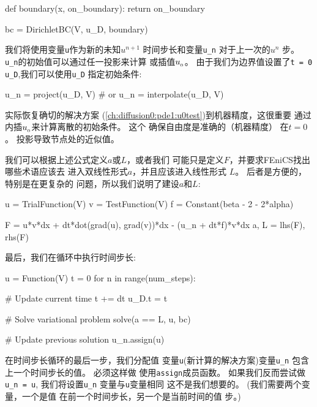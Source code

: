 \begin{python}
def boundary(x, on_boundary):
    return on_boundary

bc = DirichletBC(V, u_D, boundary)
\end{python}

我们将使用变量\texttt{u}作为新的未知$u^{n+1}$
时间步长和变量\verb!u_n! 对于上一次的$u^n$
步。 \verb!u_n!的初始值可以通过任一投影来计算
或插值$u_{_0}$。 由于我们为边界值设置了\texttt{t = 0}
\verb!u_D!,我们可以使用\verb!u_D! 指定初始条件:

\begin{python}
u_n = project(u_D, V)
# or
u_n = interpolate(u_D, V)
\end{python}

\begin{notice}[投影与内插初始条件]
实际恢复确切的解决方案
(\ref{ch:diffusion0:pde1:u0test})到机器精度，这很重要
通过内插$u_{_0}$来计算离散的初始条件。 这个
确保自由度是准确的（机器精度）
在$t=0$。 投影导致节点处的近似值。
\end{notice}


我们可以根据上述公式定义$a$或$L$，或者我们
可能只是定义$F$，并要求FEniCS找出哪些术语应该去
进入双线性形式$a$，并且应该进入线性形式
$L$。 后者是方便的，特别是在更复杂的
问题，所以我们说明了建设$a$和$L$:

\begin{python}
u = TrialFunction(V)
v = TestFunction(V)
f = Constant(beta - 2 - 2*alpha)

F = u*v*dx + dt*dot(grad(u), grad(v))*dx - (u_n + dt*f)*v*dx
a, L = lhs(F), rhs(F)
\end{python}

最后，我们在循环中执行时间步长:

\begin{python}
u = Function(V)
t = 0
for n in range(num_steps):

    # Update current time
    t += dt
    u_D.t = t

    # Solve variational problem
    solve(a == L, u, bc)

    # Update previous solution
    u_n.assign(u)
\end{python}
在时间步长循环的最后一步，我们分配值
变量\texttt{u}(新计算的解决方案)变量\verb!u_n!
包含上一个时间步长的值。 必须这样做
使用\texttt{assign}成员函数。 如果我们反而尝试做\verb!u_n = u!,
我们将设置\verb!u_n! 变量与\texttt{u}变量相同
这不是我们想要的。 (我们需要两个变量，一个是值
在前一个时间步长，另一个是当前时间的值
步。)

